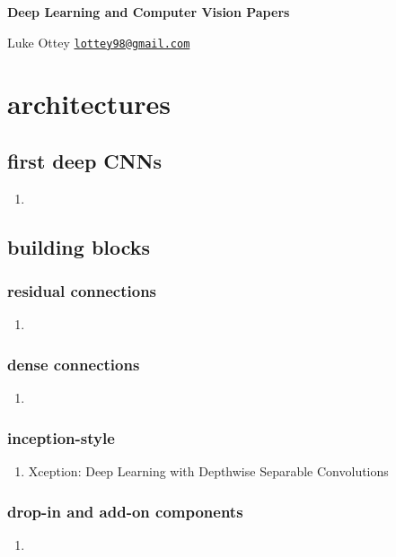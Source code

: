 \documentclass[acmlarge]{acmart}
\author{Luke Ottey}
\begin{document}
\begin{center}
\textbf{Deep Learning and Computer Vision Papers}
\end{center}
Luke Ottey
\newline
\href{mailto:lottey98@gmail.com}{\nolinkurl{lottey98@gmail.com}} 
\singlespacing
\tableofcontents
\newpage
{}
\section{architectures}
	\subsection{first deep CNNs}
	\begin{enumerate}
		\item
	\end{enumerate}
	\subsection{building blocks}
		\subsubsection{residual connections}
		\begin{enumerate}
			\item
		\end{enumerate}
		\subsubsection{dense connections}
		\begin{enumerate}
			\item
		\end{enumerate}
		\subsubsection{inception-style}
		\begin{enumerate}
			\item Xception: Deep Learning with Depthwise Separable Convolutions \cite{Chollet2017XceptionDL} 

		\end{enumerate}
		\subsubsection{drop-in and add-on components}
		\begin{enumerate}
			\item
		\end{enumerate}
	\begin{enumerate}
	\end{enumerate}
\end{document}
